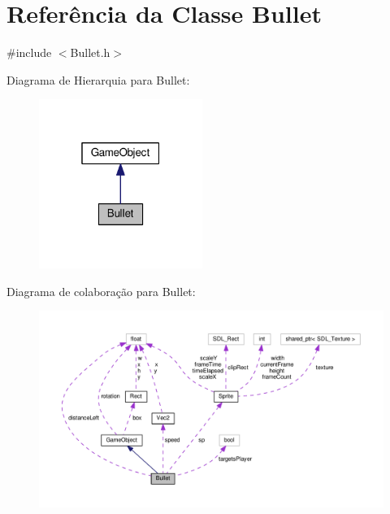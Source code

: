 \hypertarget{classBullet}{\section{Referência da Classe Bullet}
\label{classBullet}
}


{\ttfamily \#include $<$Bullet.\+h$>$}



Diagrama de Hierarquia para Bullet\+:\nopagebreak
\begin{figure}[H]
\begin{center}
\leavevmode
\includegraphics[width=151pt]{classBullet__inherit__graph}
\end{center}
\end{figure}


Diagrama de colaboração para Bullet\+:
\nopagebreak
\begin{figure}[H]
\begin{center}
\leavevmode
\includegraphics[width=350pt]{classBullet__coll__graph}
\end{center}
\end{figure}

